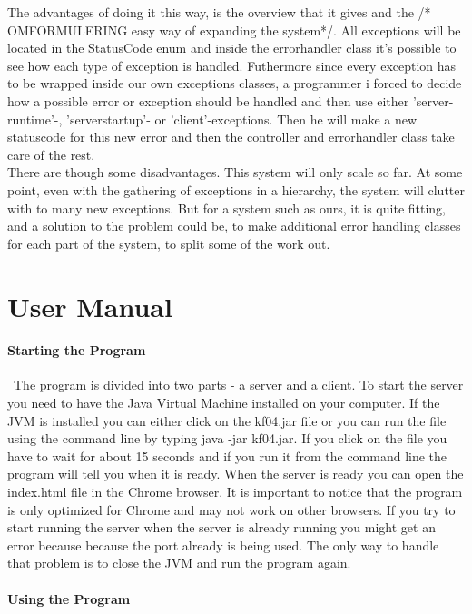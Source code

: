 \documentclass[a4paper,10pt,titlepage]{article}
\begin{document}
			The advantages of doing it this way, is the overview that it gives and the /* OMFORMULERING easy way of expanding the system*/. All exceptions will be located in the StatusCode enum and inside the errorhandler class it's possible to see how each type of exception is handled. Futhermore since every exception has to be wrapped inside our own exceptions classes, a programmer i forced to decide how a possible error or exception should be handled and then use either 'server-runtime'-, 'serverstartup'- or 'client'-exceptions. Then he will make a new statuscode for this new error and then the controller and errorhandler class take care of the rest.\\
		There are though some disadvantages. This system will only scale so far. At some point, even with the gathering of exceptions in a hierarchy, the system will clutter with to many new exceptions. But for a system such as ours, it is quite fitting, and a solution to the problem could be, to make additional error handling classes for each part of the system, to split some of the work out.\\
	\newpage
	\section{User Manual}
		\paragraph{Starting the Program}\mbox{}\
		The program is divided into two parts - a server and a client. To start the server you need to have the Java Virtual Machine installed on your computer. If the JVM is installed you can either click on the kf04.jar file or you can run the file using the command line by typing java -jar kf04.jar. If you click on the file you have to wait for about 15 seconds and if you run it from the command line the program will tell you when it is ready. When the server is ready you can open the index.html file in the Chrome browser. It is important to notice that the program is only optimized for Chrome and may not work on other browsers. If you try to start running the server when the server is already running you might get an error because because the port already is being used. The only way to handle that problem is to close the JVM and run the program again.  
		\paragraph{Using the Program}\mbox{}\
		
\end{document}
